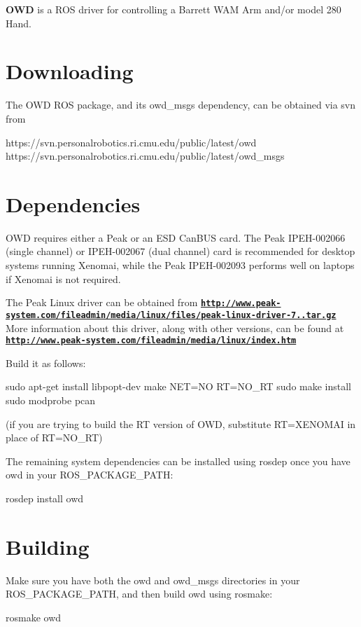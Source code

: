 

{\bfseries O\-W\-D} is a R\-O\-S driver for controlling a Barrett W\-A\-M Arm and/or model 280 Hand.\hypertarget{index_downloading}{}\section{Downloading}\label{index_downloading}
The O\-W\-D R\-O\-S package, and its owd\-\_\-msgs dependency, can be obtained via svn from \begin{DoxyVerb}https://svn.personalrobotics.ri.cmu.edu/public/latest/owd
https://svn.personalrobotics.ri.cmu.edu/public/latest/owd_msgs
\end{DoxyVerb}
\hypertarget{index_dependencies}{}\section{Dependencies}\label{index_dependencies}
O\-W\-D requires either a Peak or an E\-S\-D Can\-B\-U\-S card. The Peak I\-P\-E\-H-\/002066 (single channel) or I\-P\-E\-H-\/002067 (dual channel) card is recommended for desktop systems running Xenomai, while the Peak I\-P\-E\-H-\/002093 performs well on laptops if Xenomai is not required.

The Peak Linux driver can be obtained from {\bfseries \href{http://www.peak-system.com/fileadmin/media/linux/files/peak-linux-driver-7.7.tar.gz}{\tt http\-://www.\-peak-\/system.\-com/fileadmin/media/linux/files/peak-\/linux-\/driver-\/7..\-tar.\-gz}} More information about this driver, along with other versions, can be found at {\bfseries \href{http://www.peak-system.com/fileadmin/media/linux/index.htm}{\tt http\-://www.\-peak-\/system.\-com/fileadmin/media/linux/index.\-htm}} 

Build it as follows\-: \begin{DoxyVerb}  sudo apt-get install libpopt-dev
  make NET=NO RT=NO_RT
  sudo make install
  sudo modprobe pcan
\end{DoxyVerb}
 (if you are trying to build the R\-T version of O\-W\-D, substitute R\-T=X\-E\-N\-O\-M\-A\-I in place of R\-T=N\-O\-\_\-\-R\-T)

The remaining system dependencies can be installed using rosdep once you have owd in your R\-O\-S\-\_\-\-P\-A\-C\-K\-A\-G\-E\-\_\-\-P\-A\-T\-H\-: \begin{DoxyVerb}rosdep install owd
\end{DoxyVerb}
\hypertarget{index_building}{}\section{Building}\label{index_building}
Make sure you have both the owd and owd\-\_\-msgs directories in your R\-O\-S\-\_\-\-P\-A\-C\-K\-A\-G\-E\-\_\-\-P\-A\-T\-H, and then build owd using rosmake\-: \begin{DoxyVerb}rosmake owd
\end{DoxyVerb}


